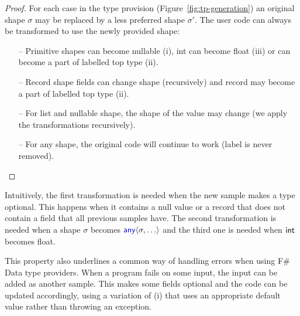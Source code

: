 \documentclass[10pt]{sigplanconf}
\newcommand{\kvd}[1]{\textnormal{\textcolor{kvdclr}{\sffamily #1}}}
\newcommand{\ident}[1]{\textnormal{\sffamily #1}}
\begin{document}
\begin{proof}
For each case in the type provision (Figure~\ref{fig:tp-generation}) an original shape $\sigma$
may be replaced by a less preferred shape $\sigma'$. The user code can always be transformed
to use the newly provided shape:

\begin{itemize}
\item[--] Primitive shapes can become nullable (i), \ident{int} can become \ident{float} (iii)
  or can become a part of labelled top type (ii).
\item[--] Record shape fields can change shape (recursively) and record may become a part
  of labelled top type (ii).
\item[--] For list and nullable shape, the shape of the value may change (we apply the 
  transformations recursively).
\item[--] For any shape, the original code will continue to work (label is never removed).
\end{itemize}
\vspace{-1.5em}
\end{proof}
%
\noindent
Intuitively, the first transformation is needed when the new sample makes a type optional.
This happens when it contains a \kvd{null} value or a record that does not contain a field 
that all previous samples have. The second transformation is needed when a shape $\sigma$ 
becomes $\kvd{any}\langle\sigma, \ldots\rangle$ and the third one is needed when $\ident{int}$
becomes \ident{float}.

This property also underlines a common way of handling errors when using F\# Data type providers.
When a program fails on some input, the input can be added as another sample. This makes some
fields optional and the code can be updated accordingly, using a variation of (i) that uses
an appropriate default value rather than throwing an exception.



%
%
\end{document}
